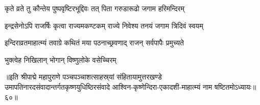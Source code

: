 \twolineshloka
{कृते व्रते तु कौन्तेय पुष्पवृष्टिरभूद्दिवः}
{तत् पिता गरुडारूढो जगाम हरिमन्दिरम्}%

\twolineshloka
{इन्द्रसेनोऽपि राजर्षिः कृत्वा राज्यमकण्टकम्}
{राज्ये निवेश्य तनयं जगाम त्रिदिवं स्वयम्}%

\twolineshloka
{इन्दिराव्रतमाहात्म्यं तवाग्रे कथितं मया}
{पठनाच्छ्रवणाद् राजन् सर्वपापैः प्रमुच्यते}%

\onelineshloka
{भुक्त्वेह निखिलान् भोगान् विष्णुलोके वसेच्चिरम्}%

॥इति श्रीपाद्मे महापुराणे पञ्चपञ्चाशत्साहस्र्यां संहितायामुत्तरखण्डे उमापतिनारदसंवादान्तर्गतकृष्णयुधिष्ठिरसंवादे आश्विन-कृष्णेन्दिरा-एकादशी-माहात्म्यं नाम षष्टितमोऽध्यायः॥६०॥

\genMangalaShloka

\hyperref[sec:ekadashi_mahatmyam_padma_puranam]{\closesub}
\clearpage

